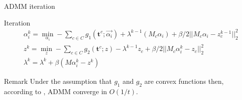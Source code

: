 \documentclass{beamer}
\begin{document}
\begin{frame}{ADMM iteration}
    \begin{block}{Iteration}
    \begin{equation}
        \begin{split}
            &\alpha_i^k = \min_{\alpha_i} -\sum_{c\in C} g_1(\textbf{t}^c;\Vec{\alpha_i}) + \lambda^{k-1}(M_c \alpha_i) + \beta/2 ||M_c\alpha_i - z_c^{k-1}||^2_2\\
            &z^k = \min_z -\sum_{c\in C} g_2(\textbf{t}^c;z) - \lambda^{k-1} z_c + \beta/2 ||M_c \alpha_i^k -z_c||_2^2\\
            &\lambda^k = \lambda^k + \beta(M\alpha_i^k - z^k)
        \end{split}
    \end{equation}
   \end{block}
    \begin{block}{Remark}
    Under the assumption that $g_1$ and $g_2$ are convex functions then, according to \cite{ADMM_Convergence}, ADMM converge in $O(1/t)$.
    \end{block}
\end{frame}
\end{document}

